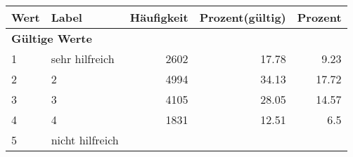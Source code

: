      \begin{longtable}{lXrrr}
     \toprule
     \textbf{Wert} & \textbf{Label} & \textbf{Häufigkeit} & \textbf{Prozent(gültig)} & \textbf{Prozent} \\
     \endhead
     \midrule
     \multicolumn{5}{l}{\textbf{Gültige Werte}}\\

     1 &
     \multicolumn{1}{X}{ sehr hilfreich   } &


       \num{2602} &
       \num[round-mode=places,round-precision=2]{17.78} &
         \num[round-mode=places,round-precision=2]{9.23} \\

     2 &
     \multicolumn{1}{X}{ 2   } &


       \num{4994} &
       \num[round-mode=places,round-precision=2]{34.13} &
         \num[round-mode=places,round-precision=2]{17.72} \\

     3 &
     \multicolumn{1}{X}{ 3   } &


       \num{4105} &
       \num[round-mode=places,round-precision=2]{28.05} &
         \num[round-mode=places,round-precision=2]{14.57} \\

     4 &
     \multicolumn{1}{X}{ 4   } &


       \num{1831} &
       \num[round-mode=places,round-precision=2]{12.51} &
         \num[round-mode=places,round-precision=2]{6.5} \\

     5 &
     \multicolumn{1}{X}{ nicht hilfreich   } &



\end{longtable}
